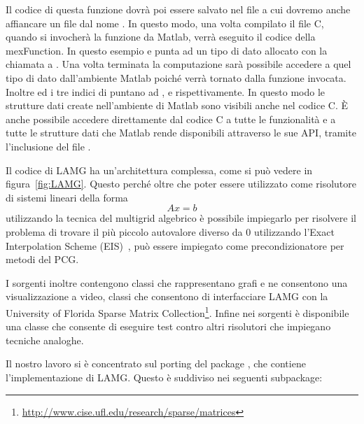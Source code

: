 Il codice di questa funzione dovrà poi essere salvato nel file  a cui dovremo anche affiancare un file dal nome . In questo modo, una volta compilato il file C, quando si invocherà la funzione  da Matlab, verrà eseguito il codice della mexFunction.
In questo esempio  e  punta ad un tipo di dato allocato con la chiamata a . 
Una volta terminata la computazione sarà possibile accedere a quel tipo di dato dall'ambiente Matlab poiché verrà tornato dalla funzione invocata. Inoltre  ed i tre indici di  puntano ad ,  e  rispettivamente. In questo modo le strutture dati create nell'ambiente di Matlab sono visibili anche nel codice C.
È anche possibile accedere direttamente dal codice C a tutte le funzionalità e a tutte le strutture dati che Matlab rende disponibili attraverso le sue API, tramite l'inclusione del file .



Il codice di LAMG ha un'architettura complessa, come si può vedere in figura~\vref{fig:LAMG}. Questo perché oltre che poter essere utilizzato come risolutore di sistemi lineari della forma
\begin{equation*}
Ax = b
\end{equation*}
utilizzando la tecnica del multigrid algebrico è possibile impiegarlo per risolvere il problema di trovare il più piccolo autovalore diverso da $0$ utilizzando l'Exact Interpolation Scheme (EIS)~\cite[§5.4]{lamg_Report}, può essere impiegato come precondizionatore per metodi del PCG.

I sorgenti inoltre contengono classi che rappresentano grafi e ne consentono una visualizzazione a video, classi che consentono di interfacciare LAMG con la University of Florida Sparse Matrix Collection\footnote{\url{http://www.cise.ufl.edu/research/sparse/matrices}}.
Infine nei sorgenti è disponibile una classe che consente di eseguire test contro altri risolutori che impiegano tecniche analoghe.

Il nostro lavoro si è concentrato sul porting del package , che contiene l'implementazione di LAMG. Questo è suddiviso nei seguenti subpackage:

